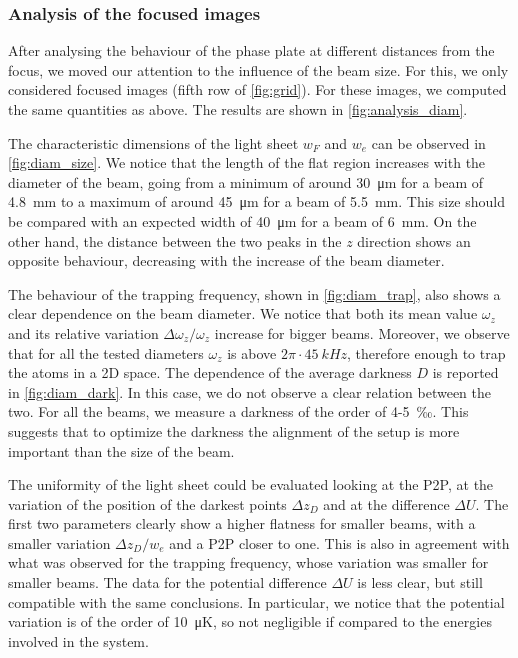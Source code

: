 \subsubsection{Analysis of the focused images}
After analysing the behaviour of the phase plate at different distances from the focus, we moved our attention to the influence of the beam size. For this, we only considered focused images (fifth row of \cref{fig:grid}). For these images, we computed the same quantities as above.
The results are shown in \cref{fig:analysis_diam}.

The characteristic dimensions of the light sheet $w_F$ and $w_e$ can be observed in \cref{fig:diam_size}. We notice that  the length of the flat region increases with the diameter of the beam, going from a minimum of around \SI{30}{\micro m} for a beam of \SI{4.8}{mm} to a maximum of around \SI{45}{\micro m} for a beam of \SI{5.5}{mm}. This size should be compared with an expected width of \SI{40}{\micro m} for a beam of \SI{6}{mm}. On the other hand, the distance between the two peaks in the $z$ direction shows an opposite behaviour, decreasing with the increase of the beam diameter.

The behaviour of the trapping frequency, shown in \cref{fig:diam_trap}, also shows a clear dependence on the beam diameter. We notice that both its mean value $\omega_z$ and its relative variation $\Delta \omega_z / \omega_z$ increase for bigger beams. Moreover, we observe that for all the tested diameters $\omega_z$ is above $2\pi\cdot\SI{45}{kHz}$, therefore enough to trap the atoms in a 2D space. The dependence of the average darkness $D$ is reported in \cref{fig:diam_dark}. In this case, we do not observe a clear relation between the two. For all the beams, we measure a darkness of the order of 4-5~‰. This suggests that to optimize the darkness the alignment of the setup is more important than the size of the beam.

The uniformity of the light sheet could be evaluated looking at the P2P, at the variation of the position of the darkest points $\Delta z_D$ and at the difference $\Delta U$. The first two parameters clearly show a higher flatness for smaller beams, with a smaller variation $\Delta z_D / w_e$ and a P2P closer to one. This is also in agreement with what was observed for the trapping frequency, whose variation was smaller for smaller beams. The data for the potential difference $\Delta U$ is less clear, but still compatible with the same conclusions. In particular, we notice that the potential variation is of the order of \SI{10}{\micro K}, so not negligible if compared to the energies involved in the system.

